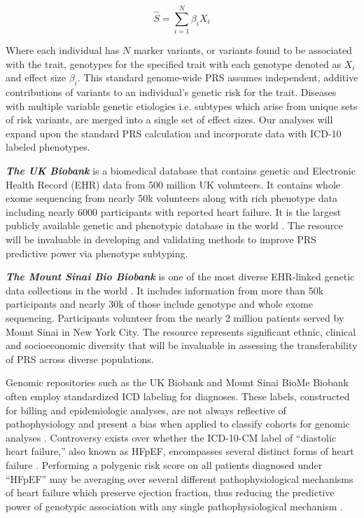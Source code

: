 \documentclass[11pt]{article}  %
\begin{document}
$$
\hat{S} = \sum_{i=1}^{N} \beta_i X_i
$$

Where each individual has $N$ marker variants, or variants found to be associated with the trait, genotypes for the specified trait with each genotype denoted as $X_i$ and effect size $\beta_i$. This standard genome-wide PRS assumes independent, additive contributions of variants to an individual's genetic risk for the trait. Diseases with multiple variable genetic etiologies i.e. subtypes which arise from unique sets of risk variants, are merged into a single set of effect sizes. Our analyses will expand upon the standard PRS calculation and incorporate data with ICD-10 labeled phenotypes. 

\textbf{\textit{The UK Biobank}} is a biomedical database that contains genetic and Electronic Health Record (EHR) data from 500 million UK volunteers. It contains whole exome sequencing from nearly 50k volunteers along with rich phenotype data including nearly 6000 participants with reported heart failure. It is the largest publicly available genetic and phenotypic database in the world \cite{sudlow_uk_2015}. The resource will be invaluable in developing and validating methods to improve PRS predictive power via phenotype subtyping.

\textbf{\textit{The Mount Sinai Bio Biobank}} is one of the most diverse EHR-linked genetic data collections in the world \cite{belbin_toward_2021}. It includes information from more than 50k participants and nearly 30k of those include genotype and whole exome sequencing. Participants volunteer from the nearly 2 million patients served by Mount Sinai in New York City. The resource represents significant ethnic, clinical and socioeconomic diversity that will be invaluable in assessing the transferability of PRS across diverse populations.   

\hspace{10mm}Genomic repositories such as the UK Biobank and Mount Sinai BioMe Biobank often employ standardized ICD labeling for diagnoses. These labels, constructed for billing and epidemiologic analyses, are not always reflective of pathophysiology and present a bias when applied to classify cohorts for genomic analyses \cite{weiner_point_2018, cox_good_2009}. Controversy exists over whether the ICD-10-CM label of “diastolic heart failure,” also known as HFpEF, encompasses several distinct forms of heart failure \cite{severino_structural_2020}. Performing a polygenic risk score on all patients diagnosed under “HFpEF” may be averaging over several different pathophysiological mechanisms of heart failure which preserve ejection fraction, thus reducing the predictive power of genotypic association with any single pathophysiological mechanism \cite{andersson_association_2018}.
\end{document}
